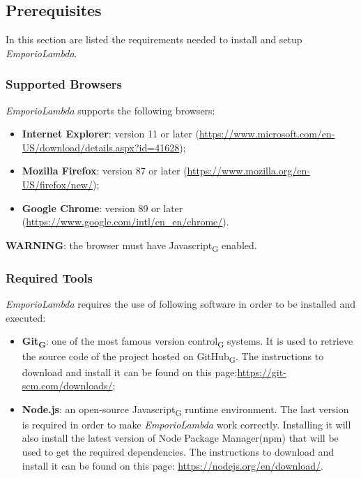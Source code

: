 \subsection{Prerequisites}
In this section are listed the requirements needed to install and setup \textit{EmporioLambda}.

\subsubsection{Supported Browsers}
\textit{EmporioLambda} supports the following browsers:
\begin{itemize}
\item \textbf{Internet Explorer}: version 11 or later (\url{https://www.microsoft.com/en-US/download/details.aspx?id=41628});
\item \textbf{Mozilla Firefox}: version 87 or later (\url{https://www.mozilla.org/en-US/firefox/new/});
\item \textbf{Google Chrome}: version 89 or later (\url{https://www.google.com/intl/en_en/chrome/}).
\end{itemize}
\textbf{WARNING}: the browser must have Javascript\textsubscript{G} enabled.

\subsubsection{Required Tools}
\textit{EmporioLambda} requires the use of following software in order to be installed and executed:
\begin{itemize}
\item \textbf{Git\textsubscript{G}}: one of the most famous version control\textsubscript{G} systems. It is used to retrieve the source code of the project hosted on GitHub\textsubscript{G}. The instructions to download and install it can be found on this page:\url{https://git-scm.com/downloads/};
\item \textbf{Node.js}: an open-source Javascript\textsubscript{G} runtime environment. The last version is required in order to make \textit{EmporioLambda} work correctly. Installing it will also install the latest version of Node Package Manager(npm) that will be used to get the required dependencies. The instructions to download and install it can be found on this page: \url{https://nodejs.org/en/download/}.
\end{itemize}

